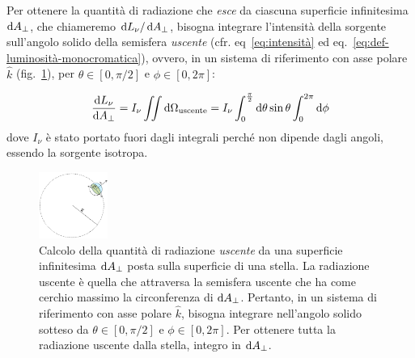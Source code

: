 Per ottenere la quantità di radiazione che \emph{esce} da ciascuna superficie infinitesima $\mathop{\mathrm{{}d}}\mathopen{} A_\perp$, che chiameremo $\mathop{\mathrm{{}d}}\mathopen{} L_\nu / \mathop{\mathrm{{}d}}\mathopen{} A_\perp$, bisogna integrare l'intensità della sorgente sull'angolo solido della semisfera \emph{uscente} (cfr. eq~\eqref{eq:intensità} ed eq.~\eqref{eq:def-luminosità-monocromatica}), ovvero, in un sistema di riferimento con asse polare $\hat{k}$ (fig.~\ref{fig:emisfera-uscente}), per $\theta \in [0, \pi/2]$ e $\phi \in [0, 2\pi]$:

\begin{equation}\label{eq:differenziale-luminosità}
    \frac{\mathop{\mathrm{{}d}}\mathopen{} L_\nu}{\mathop{\mathrm{{}d}}\mathopen{} A_\perp} = I_\nu \iint \mathop{\mathrm{{}d}}\mathopen{} \Omega_\textup{uscente} = I_\nu \int_{0}^{\frac{\pi}{2}} \mathop{\mathrm{{}d}}\mathopen{} \theta \sin{\theta} \int_{0}^{2\pi} \mathop{\mathrm{{}d}}\mathopen{} \phi
\end{equation}
dove $I_\nu$ è stato portato fuori dagli integrali perché non dipende dagli angoli, essendo la sorgente isotropa.

\begin{figure}
\centering
\includegraphics[width=0.2\textwidth]{immagini/emisfera-uscente.png}
\caption{Calcolo della quantità di radiazione \emph{uscente} da una superficie infinitesima $\mathop{\mathrm{{}d}}\mathopen{} A_\perp$ posta sulla superficie di una stella. La radiazione uscente è quella che attraversa la semisfera uscente che ha come cerchio massimo la circonferenza di $\mathop{\mathrm{{}d}}\mathopen{} A_\perp$. Pertanto, in un sistema di riferimento con asse polare $\hat{k}$, bisogna integrare nell'angolo solido sotteso da $\theta \in [0, \pi/2]$ e $\phi \in [0, 2 \pi]$. Per ottenere tutta la radiazione uscente dalla stella, integro in $\mathop{\mathrm{{}d}}\mathopen{} A_\perp$.}
\label{fig:emisfera-uscente}
\end{figure}

